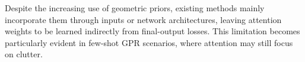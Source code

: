 \documentclass[lettersize,journal]{IEEEtran}
\begin{document}
Despite the increasing use of geometric priors, existing methods mainly incorporate them through inputs or network architectures, leaving attention weights to be learned indirectly from final-output losses. This limitation becomes particularly evident in few-shot GPR scenarios, where attention may still focus on clutter.



\end{document}
